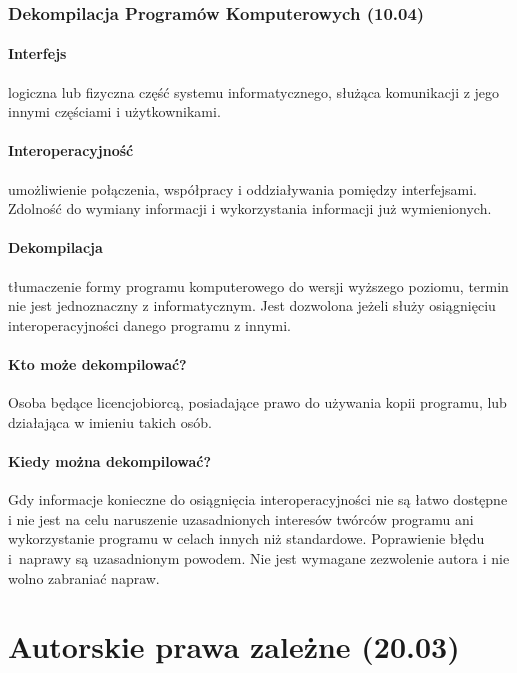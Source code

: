 \documentclass{article}
\begin{document}
\subsubsection{Dekompilacja Programów Komputerowych (10.04)}

\paragraph{Interfejs}

logiczna lub fizyczna część systemu informatycznego, służąca komunikacji z jego innymi częściami i użytkownikami.

\paragraph{Interoperacyjność}

umożliwienie połączenia, współpracy i oddziaływania pomiędzy interfejsami.
Zdolność do wymiany informacji i wykorzystania informacji już wymienionych.

\paragraph{Dekompilacja}

tłumaczenie formy programu komputerowego do wersji wyższego poziomu, termin nie jest jednoznaczny z informatycznym. Jest dozwolona jeżeli służy osiągnięciu interoperacyjności danego programu z innymi.

\paragraph{Kto może dekompilować?}

Osoba będące licencjobiorcą, posiadające prawo do używania kopii programu, lub działająca w imieniu takich osób.

\paragraph{Kiedy można dekompilować?}

Gdy informacje konieczne do osiągnięcia interoperacyjności nie są łatwo dostępne i nie jest na celu naruszenie uzasadnionych interesów twórców programu ani wykorzystanie programu w celach innych niż standardowe.
Poprawienie błędu i~naprawy są uzasadnionym powodem.
Nie jest wymagane zezwolenie autora i nie wolno zabraniać napraw.


\section{Autorskie prawa zależne (20.03)}
\end{document}
